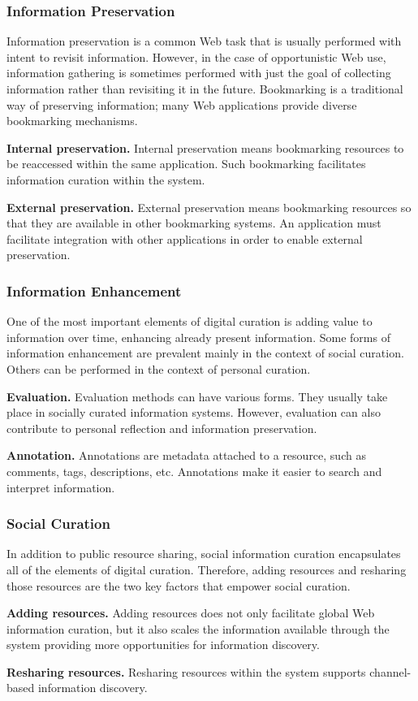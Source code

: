 \documentclass{casconpaper}
\begin{document}
{\subsubsection{Information Preservation}
Information preservation is a common Web task that is usually performed with intent to revisit information. However, in the case of opportunistic Web use, information gathering is sometimes performed with just the goal of collecting information rather than revisiting it in the future. Bookmarking is a traditional way of preserving information; many Web applications provide diverse bookmarking mechanisms. 

\textbf{Internal preservation.} Internal preservation means bookmarking resources to be reaccessed within the same application. Such bookmarking facilitates information curation within the system.
  
\textbf{External preservation.} External preservation means bookmarking resources so that they are available in other bookmarking systems. An application must facilitate integration with other applications in order to enable external preservation.

} %

{\subsubsection{Information Enhancement}
One of the most important elements of digital curation is adding value to information over time, enhancing already present information. Some forms of information enhancement are prevalent mainly in the context of social curation. Others can be performed in the context of personal curation. 

\textbf{Evaluation.} Evaluation methods can have various forms. They usually take place in socially curated information systems. However, evaluation can also contribute to personal reflection and information preservation. 

\textbf{Annotation.} Annotations are metadata attached to a resource, such as comments, tags, descriptions, etc. Annotations make it easier to search and interpret information. 
} %

{\subsubsection{Social Curation}
In addition to public resource sharing, social information curation encapsulates all of the elements of digital curation. Therefore, adding resources and resharing those resources are the two key factors that empower social curation.

\textbf{Adding resources.} Adding resources does not only facilitate global Web information curation, but it also scales the information available through the system providing more opportunities for information discovery.

\textbf{Resharing resources.} Resharing resources within the system supports channel-based information discovery. 
 

} %
\end{document}
